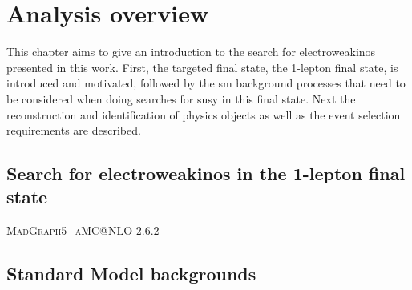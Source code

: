 
\chapter{Analysis overview}\label{ch:1lepton}

\ifpdf
    \graphicspath{{chapter-analysis/Figs/Raster/}{chapter-analysis/Figs/PDF/}{chapter-analysis/Figs/}}
\else
    \graphicspath{{chapter-analysis/Figs/Vector/}{chapter-analysis/Figs/}}
\fi


This chapter aims to give an introduction to the search for electroweakinos presented in this work. First, the targeted final state, the 1-lepton final state, is introduced and motivated, followed by the \gls{sm} background processes that need to be considered when doing searches for \gls{susy} in this final state. Next the reconstruction and identification of physics objects as well as the event selection requirements are described.

\section{Search for electroweakinos in the 1-lepton final state}


\textsc{MadGraph5\_aMC@NLO} 2.6.2~\cite{MGaMCNLO:2014hca,Frederix:2012ps}


\section{Standard Model backgrounds}

